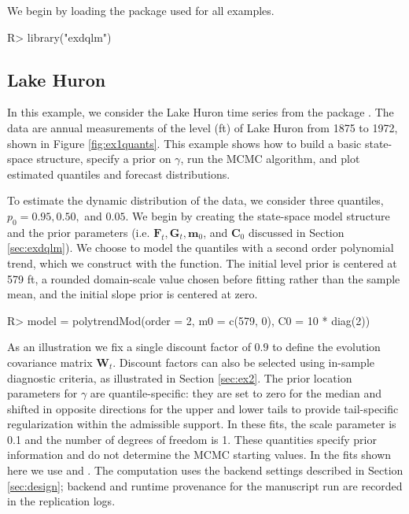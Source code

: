 \documentclass{jss}
\newcommand{\mat}[1]{\mathbf{#1}}
\begin{document}
We begin by loading the  package used for all examples.

\begin{CodeChunk}
\begin{CodeInput}
R> library("exdqlm")
\end{CodeInput}
\end{CodeChunk}


\subsection{Lake Huron}
\label{sec:ex1}

In this example, we consider the Lake Huron time series from the package . The data are annual measurements of the level (ft) of Lake Huron from 1875 to 1972, shown in Figure \ref{fig:ex1quants}. This example shows how to build a basic state-space structure, specify a prior on $\gamma$, run the MCMC algorithm, and plot estimated quantiles and forecast distributions.

To estimate the dynamic distribution of the data, we consider three quantiles, $p_0=0.95,0.50,$ and $0.05$. We begin by creating the state-space model structure and the prior parameters (i.e. $\mat{F}_t,\mat{G}_t, \mat{m}_0$, and $\mat{C}_0$ discussed in Section \ref{sec:exdqlm}). We choose to model the quantiles with a second order polynomial trend, which we construct with the  function. The initial level prior is centered at 579 ft, a rounded domain-scale value chosen before fitting rather than the sample mean, and the initial slope prior is centered at zero.
\begin{CodeChunk}
\begin{CodeInput}
R> model = polytrendMod(order = 2, m0 = c(579, 0), C0 = 10 * diag(2))
\end{CodeInput}
\end{CodeChunk}

As an illustration we fix a single discount factor of $0.9$ to define the evolution covariance matrix $\mat{W}_t$.
 Discount factors can also be selected using in-sample diagnostic criteria, as illustrated in Section \ref{sec:ex2}.
 The prior location parameters for \(\gamma\) are quantile-specific: they are set to zero for the median and shifted in opposite directions for the upper and lower tails to provide tail-specific regularization within the admissible support. In these fits, the scale parameter is 0.1 and the number of degrees of freedom is 1. These quantities specify prior information and do not determine the MCMC starting values.
 In the fits shown here we use  and . The computation uses the backend settings described in Section \ref{sec:design}; backend and runtime provenance for the manuscript run are recorded in the replication logs.
\end{document}

